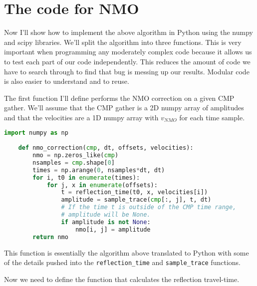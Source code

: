 \section{The code for NMO}

Now I'll show how to implement the above algorithm in Python using the numpy and scipy libraries.
We'll split the algorithm into three functions.
This is very important when programming any moderately complex code because it allows us to test each part of our code independently.
This reduces the amount of code we have to search through to find that bug is messing up our results.
Modular code is also easier to understand and to reuse.

The first function I'll define performs the NMO correction on a given CMP gather.
We'll assume that the CMP gather is a 2D numpy array of amplitudes and that the
velocities are a 1D numpy array with $v_{NMO}$ for each time sample.

\begin{lstlisting}[language=python]
    import numpy as np
    
    def nmo_correction(cmp, dt, offsets, velocities):
        nmo = np.zeros_like(cmp)
        nsamples = cmp.shape[0]
        times = np.arange(0, nsamples*dt, dt)
        for i, t0 in enumerate(times):
            for j, x in enumerate(offsets):
                t = reflection_time(t0, x, velocities[i])
                amplitude = sample_trace(cmp[:, j], t, dt)
                # If the time t is outside of the CMP time range,
                # amplitude will be None.
                if amplitude is not None:
                    nmo[i, j] = amplitude
        return nmo
\end{lstlisting}

This function is essentially the algorithm above translated to Python with some
of the details pushed into the \texttt{reflection_time} and
\texttt{sample_trace} functions.

Now we need to define the function that calculates the reflection travel-time.

